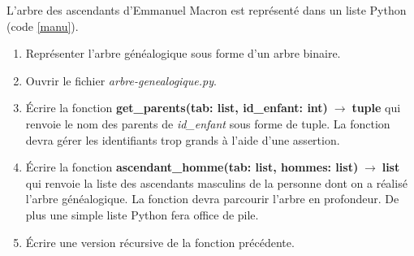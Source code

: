 \documentclass[a4paper,11pt]{article}
\begin{document}
\begin{Form}
\begin{exo}
\begin{enumerate}
        \end{enumerate}
        L'arbre des ascendants d'Emmanuel Macron est représenté dans un liste Python (code \ref{manu}).
        \begin{center}
            
            \label{manu}
        \end{center}
        \begin{enumerate}[resume]
            \item Représenter l'arbre généalogique sous forme d'un arbre binaire.
            \item Ouvrir le fichier \emph{arbre-genealogique.py}.
            \item Écrire la fonction \textbf{get\_parents(tab: list, id\_enfant: int)$\;\rightarrow\;$tuple} qui renvoie le nom des parents de \emph{id\_enfant} sous forme de tuple. La fonction devra gérer les identifiants trop grands à l'aide d'une assertion.
            \item Écrire la fonction \textbf{ascendant\_homme(tab: list, hommes: list)$\;\rightarrow\;$list} qui renvoie la liste des ascendants masculins de la personne dont on a réalisé l'arbre généalogique. La fonction devra parcourir l'arbre en profondeur. De plus une simple liste Python fera office de pile.
            \item Écrire une version récursive de la fonction précédente.
        \end{enumerate}
    \end{exo}
    \begin{exo}
        \begin{center}
\end{center}
\end{exo}
\end{Form}
\end{document}
